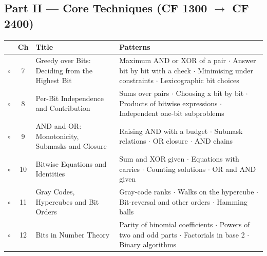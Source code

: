 \subsection*{Part II --- Core Techniques (CF 1300 $\to$ CF 2400)}
\begin{tabularx}{\linewidth}{@{}c c >{\raggedright\arraybackslash}p{3.6cm} X@{}}
\toprule
& \textbf{Ch} & \textbf{Title} & \textbf{Patterns} \\
\midrule
$\circ$ & 7 & Greedy over Bits: Deciding from the Highest Bit & Maximum AND or XOR of a pair $\cdot$ Answer bit by bit with a check $\cdot$ Minimising under constraints $\cdot$ Lexicographic bit choices \\
$\circ$ & 8 & Per-Bit Independence and Contribution & Sums over pairs $\cdot$ Choosing x bit by bit $\cdot$ Products of bitwise expressions $\cdot$ Independent one-bit subproblems \\
$\circ$ & 9 & AND and OR: Monotonicity, Submasks and Closure & Raising AND with a budget $\cdot$ Submask relations $\cdot$ OR closure $\cdot$ AND chains \\
$\circ$ & 10 & Bitwise Equations and Identities & Sum and XOR given $\cdot$ Equations with carries $\cdot$ Counting solutions $\cdot$ OR and AND given \\
$\circ$ & 11 & Gray Codes, Hypercubes and Bit Orders & Gray-code ranks $\cdot$ Walks on the hypercube $\cdot$ Bit-reversal and other orders $\cdot$ Hamming balls \\
$\circ$ & 12 & Bits in Number Theory & Parity of binomial coefficients $\cdot$ Powers of two and odd parts $\cdot$ Factorials in base 2 $\cdot$ Binary algorithms \\
\bottomrule
\end{tabularx}

